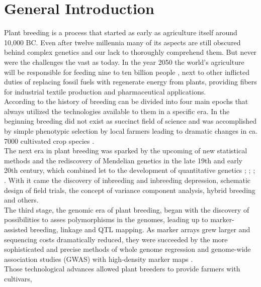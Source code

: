
\chapter{General Introduction} %
\label{Chapter0} %

Plant breeding is a process that started as early as agriculture itself around 10,000
BC. Even after twelve millennia many of its aspects are still obscured behind complex
genetics and our lack to thoroughly comprehend them. But never were the challenges the
vast as today. In the year 2050 the world's agriculture will be responsible for feeding
nine to ten billion people \cite{gerland2014world}, next to other inflicted duties of
replacing fossil fuels with regenerate energy from plants, providing fibers for industrial
textile production and pharmaceutical applications. \\
According to \cite{wallace2018road} the history of breeding can be divided into four main
epochs that always utilized the technologies available to them in a specific era. In the
beginning breeding did not exist as succinct field of science and was accomplished by
simple phenotypic selection by local farmers leading to dramatic changes
in ca. 7000 cultivated crop species \cite{khoury2016origins}.\\
The next era in plant breeding was sparked by the upcoming of new statistical methods and
the rediscovery of Mendelian genetics in the late 19th and early 20th century, which
combined let to the development of quantitative genetics \cite{tschermak1900kunstliche};
\cite{fisher1919xv}; \cite{fisher1923}; \cite{falconer1996}. With it came the discovery of
inbreeding and inbreeding depression, schematic design of field trials, the concept of variance component analysis, hybrid breeding and others. \\
The third stage, the genomic era of plant breeding, began with the discovery of
possibilities to asses polymorphisms in the genomes, leading up to marker-assisted
breeding, linkage and QTL mapping. As marker arrays grew larger and sequencing costs
dramatically reduced, they were succeeded by the more sophisticated and precise methods of
whole genome regression and genome-wide association
studies (GWAS) with high-density marker maps \cite{hayes2001,korte2013advantages}. \\
Those technological advances allowed plant breeders to provide farmers with cultivars,
